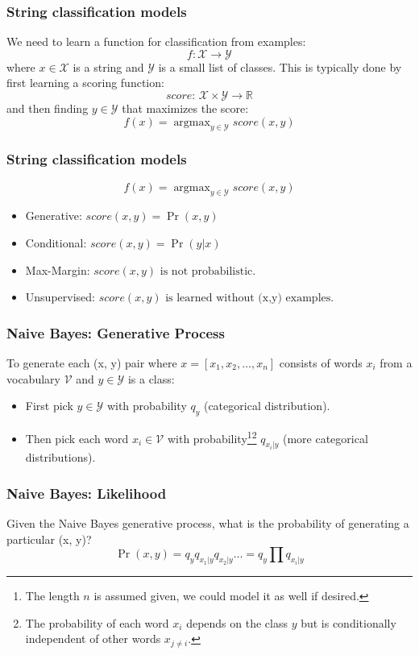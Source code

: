 \documentclass[ignorenonframetext,plain]{beamer}
\newcommand{\vocab}{\mathcal{V}}
\DeclareMathOperator*{\argmax}{argmax}
\newcommand{\score}{\mathit{score}}
\begin{document}
\begin{frame}\frametitle{String classification models}
We need to learn a function for classification from examples:\[
f: \mathcal{X}\rightarrow\mathcal{Y}
\] where $x\in\mathcal{X}$ is a string and
$\mathcal{Y}$ is a small list of classes.  This is typically done
by first learning a scoring function:\[
\score:\, \mathcal{X}\times\mathcal{Y}\rightarrow\mathbb{R}
\] and then finding $y\in\mathcal{Y}$ that maximizes the score:\[
f(x) = \argmax_{y\in\mathcal{Y}}\score(x, y)
\]
\end{frame}

\begin{frame}\frametitle{String classification models}
\[
f(x) = \argmax_{y\in\mathcal{Y}}\score(x, y)
\]
\begin{itemize}
\item Generative: $
\score(x, y) = \Pr(x, y)
$
\item Conditional: $
\score(x, y) = \Pr(y | x)
$
\item Max-Margin: $
\score(x, y) \mbox{ is not probabilistic.}
$
\item Unsupervised: $
\score(x, y) \mbox{ is learned without (x,y) examples.}
$
\end{itemize}
\end{frame}

\begin{frame}\frametitle{Naive Bayes: Generative Process}
To generate each (x, y) pair where $x = [x_1, x_2, \dots, x_n]$
consists of words $x_i$ from a vocabulary $\vocab$ and
$y\in\mathcal{Y}$ is a class:
\begin{itemize}
\item First pick $y\in\mathcal{Y}$ with probability $q_y$ (categorical
  distribution).
\item Then pick each word $x_i\in\vocab$ with probability\footnote{The
  length $n$ is assumed given, we could model it as well if
  desired.}\footnote{The probability of each word $x_i$ depends on the
  class $y$ but is conditionally independent of other words
  $x_{j\neq i}$.} $q_{x_i|y}$ (more categorical distributions).
\end{itemize}
\end{frame}

\begin{frame}\frametitle{Naive Bayes: Likelihood}
Given the Naive Bayes generative process, what is the probability of
generating a particular (x, y)?\[ \Pr(x, y) = q_y q_{x_1|y} q_{x_2|y}
\dots = q_y \prod q_{x_i|y}
\]
\end{frame}
\end{document}

